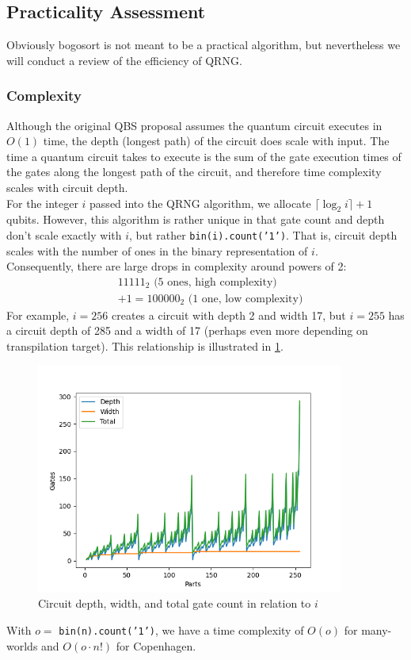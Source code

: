 \documentclass[12pt]{article}
\begin{document}
\subsection{Practicality Assessment}
Obviously bogosort is not meant to be a practical algorithm, but nevertheless we will conduct a review of the efficiency of QRNG.
\subsubsection{Complexity}
Although the original QBS proposal assumes the quantum circuit executes in $O(1)$ time, the depth (longest path) of the circuit does scale with input. The time a quantum circuit takes to execute is the sum of the gate execution times of the gates along the longest path of the circuit, and therefore time complexity scales with circuit depth. \\
For the integer $i$ passed into the QRNG algorithm, we allocate $\lceil \log_2 i \rceil + 1$ qubits. However, this algorithm is rather unique in that gate count and depth don't scale exactly with $i$, but rather \texttt{bin(i).count('1')}. That is, circuit depth scales with the number of ones in the binary representation of $i$. \\
Consequently, there are large drops in complexity around powers of 2:
\begin{align*}
&11111_2 \text{  (5 ones, high complexity)} \\ &+ 1 = 100000_2 \text{  (1 one, low complexity)}
\end{align*}
For example, $i = 256$ creates a circuit with depth 2 and width 17, but $i = 255$ has a circuit depth of 285 and a width of 17 (perhaps even more depending on transpilation target). This relationship is illustrated in \ref{fig:resources}.

\begin{figure}[h]
    \centering
    \capstart
    \includegraphics[width=0.9\textwidth]{images/resources.png}
    \caption{Circuit depth, width, and total gate count in relation to $i$}
    \label{fig:resources}
\end{figure}
\vspace{10mm}
\noindent With $o = $ \texttt{bin(n).count('1')}, we have a time complexity of $O(o)$ for many-worlds and $O(o \cdot n!)$ for Copenhagen.
\end{document}
